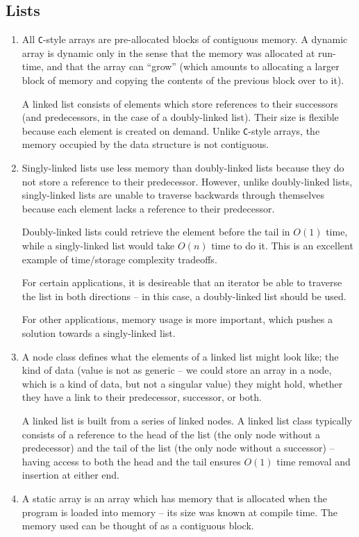 \documentclass[10pt]{article}
\begin{document}
\subsection{Lists}
\begin{enumerate}[leftmargin=0em]\addtocounter{enumi}{7}
    \item All \texttt{C}-style arrays are pre-allocated blocks of contiguous memory. A dynamic array is dynamic only in the sense that the memory was allocated at run-time, and that the array can ``grow'' (which amounts to allocating a larger block of memory and copying the contents of the previous block over to it).

    A linked list consists of elements which store references to their successors (and predecessors, in the case of a doubly-linked list). Their size is flexible because each element is created on demand. Unlike \texttt{C}-style arrays, the memory occupied by the data structure is not contiguous.
    \item Singly-linked lists use less memory than doubly-linked lists because they do not store a reference to their predecessor. However, unlike doubly-linked lists, singly-linked lists are unable to traverse backwards through themselves because each element lacks a reference to their predecessor.

    Doubly-linked lists could retrieve the element before the tail in $O(1)$ time, while a singly-linked list would take $O(n)$ time to do it. This is an excellent example of time/storage complexity tradeoffs.

    For certain applications, it is desireable that an iterator be able to traverse the list in both directions -- in this case, a doubly-linked list should be used.

    For other applications, memory usage is more important, which pushes a solution towards a singly-linked list.
    \item A node class defines what the elements of a linked list might look like; the kind of data (value is not as generic -- we could store an array in a node, which is a kind of data, but not a singular value) they might hold, whether they have a link to their predecessor, successor, or both.

    A linked list is built from a series of linked nodes. A linked list class typically consists of a reference to the head of the list (the only node without a predecessor) and the tail of the list (the only node without a successor) -- having access to both the head and the tail ensures $O(1)$ time removal and insertion at either end.
    \item A static array is an array which has memory that is allocated when the program is loaded into memory -- its size was known at compile time. The memory used can be thought of as a contiguous block.


\end{enumerate}
\end{document}
